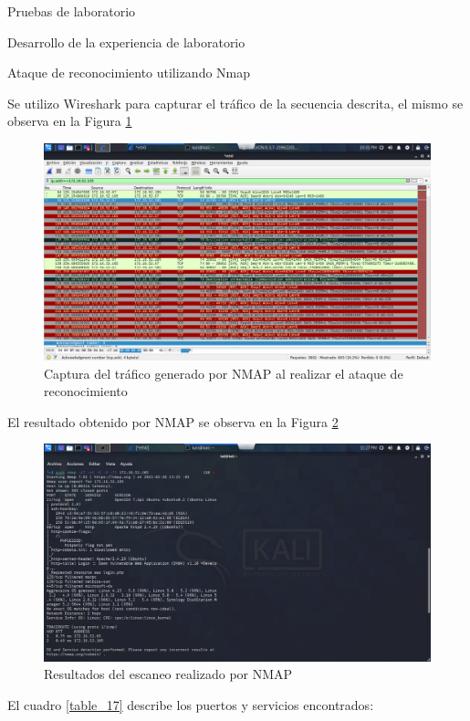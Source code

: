 \begin{section}{Pruebas de laboratorio}
\begin{subsection}{Desarrollo de la experiencia de laboratorio}
\begin{subsubsection}{Ataque de reconocimiento utilizando Nmap}
\begin{enumerate}
    \end{enumerate}
Se utilizo Wireshark \cite{wireshark} para capturar el tráfico de la secuencia descrita, el mismo se observa en la Figura \ref{fig:wireshark_nmap}    
 \begin{figure}[H]
    \centering
    \includegraphics[width=1\textwidth]{./iteracion_3_imagenes/wireshark_NMAP.png}
    \caption{Captura del tráfico generado por NMAP al realizar el ataque de reconocimiento}
    \label{fig:wireshark_nmap}
    \end{figure}
    \FloatBarrier 
    El resultado obtenido por NMAP se observa en la Figura \ref{fig:consola_kali_nmap}
\begin{figure}[H]
    \centering
    \includegraphics[width=1\textwidth]{./iteracion_3_imagenes/consola_kali_nmap.png}
    \caption{Resultados del escaneo realizado por NMAP}
    \label{fig:consola_kali_nmap}
    \end{figure}
    \FloatBarrier   
    El cuadro \ref{table_17} describe los puertos y servicios encontrados:
    \begin{table}[H]
    \resizebox{\textwidth}{!}{
}
\end{table}
\end{subsubsection}
\end{subsection}
\end{section}
